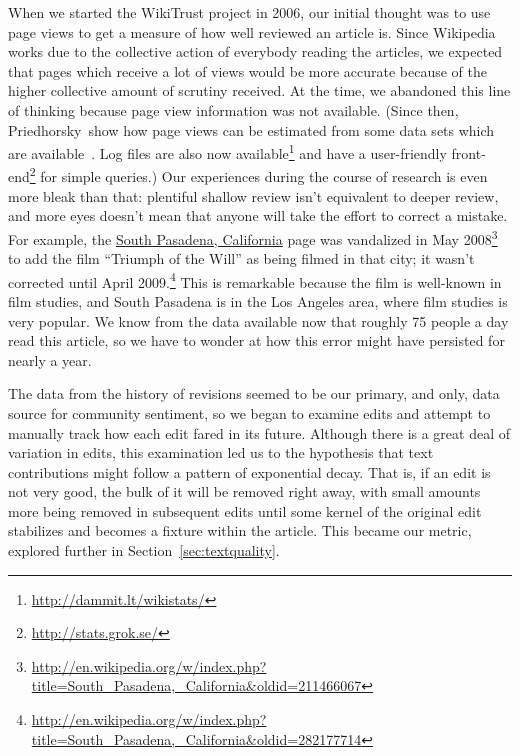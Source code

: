 When we started the WikiTrust project in 2006, our initial thought was to
use page views to get a measure of how well reviewed an article is.
Since Wikipedia works due to the collective action of everybody
reading the articles, we expected that pages which receive a lot of
views would be more accurate because of the higher collective amount
of scrutiny received.
At the time, we abandoned this line of thinking because page view
information was not available.
(Since then, Priedhorsky~\etal show how page views can be estimated
from some data sets which are available~\cite{Priedhorsky2007}.
Log files are also now
available\footnote{\url{http://dammit.lt/wikistats/}} and
have a user-friendly front-end\footnote{\url{http://stats.grok.se/}}
for simple queries.)
Our experiences during the course of research is even more
bleak than that: plentiful shallow review isn't equivalent to
deeper review, and more eyes doesn't mean that anyone will take
the effort to correct a mistake.
For example, the \underline{South Pasadena, California} page was vandalized
in May 2008\footnote{\url{http://en.wikipedia.org/w/index.php?title=South_Pasadena,_California&oldid=211466067}}
to add the film ``Triumph of the Will'' as being filmed in that city;
it wasn't corrected until
April 2009.\footnote{\url{http://en.wikipedia.org/w/index.php?title=South_Pasadena,_California&oldid=282177714}}
This is remarkable because the film is well-known in film studies,
and South Pasadena is in the Los Angeles area,
where film studies is very popular.
We know from the data available now that roughly 75 people a day
read this article, so we have to wonder at how this error might
have persisted for nearly a year.

The data from the history of revisions seemed to be our primary, and only,
data source for community sentiment, so
we began to examine edits and attempt to manually track how each
edit fared in its future.
Although there is a great deal of variation in edits, this examination
led us to the hypothesis that text contributions might follow a pattern
of exponential decay.
That is, if an edit is not very good, the bulk of it will be removed
right away, with small amounts more being removed in subsequent edits
until some kernel of the original edit stabilizes and becomes a fixture
within the article.
This became our  metric, explored further in
Section~\ref{sec:textquality}.

